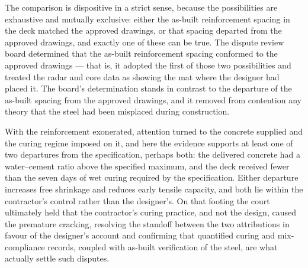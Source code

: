 \documentclass[11pt]{article}
\begin{document}
{The comparison is dispositive in a strict sense, because the possibilities are exhaustive and mutually exclusive: either the as-built reinforcement spacing in the deck matched the approved drawings, or that spacing departed from the approved drawings, and exactly one of these can be true. The dispute review board determined that the as-built reinforcement spacing conformed to the approved drawings — that is, it adopted the first of those two possibilities and treated the radar and core data as showing the mat where the designer had placed it. The board's determination stands in contrast to the departure of the as-built spacing from the approved drawings, and it removed from contention any theory that the steel had been misplaced during construction.

With the reinforcement exonerated, attention turned to the concrete supplied and the curing regime imposed on it, and here the evidence supports at least one of two departures from the specification, perhaps both: the delivered concrete had a water–cement ratio above the specified maximum, and the deck received fewer than the seven days of wet curing required by the specification. Either departure increases free shrinkage and reduces early tensile capacity, and both lie within the contractor's control rather than the designer's. On that footing the court ultimately held that the contractor's curing practice, and not the design, caused the premature cracking, resolving the standoff between the two attributions in favour of the designer's account and confirming that quantified curing and mix-compliance records, coupled with as-built verification of the steel, are what actually settle such disputes.}
\end{document}
